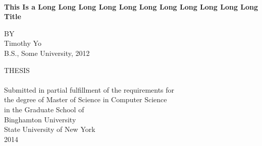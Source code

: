 \begin{center}
		{~~~~\\}
		\vspace{1.0in}
		{\Large \bf This Is a Long Long Long Long Long 
			Long Long Long Long Long Long Title\par}
    \vspace{1.0in}
    {\large BY \\}
    \vspace{0.25in}
    {\large Timothy Yo}\\
    {\small B.S., Some University, 2012}\\
\end{center} 
\vspace{1.2in}
\begin{center}
    THESIS \\~\\
    Submitted in partial fulfillment of the requirements for \\
      the degree of Master of Science in Computer Science \\
                 in  the Graduate School of\\
                   Binghamton University  \\
               State University of New York \\
                             2014
\end{center}

